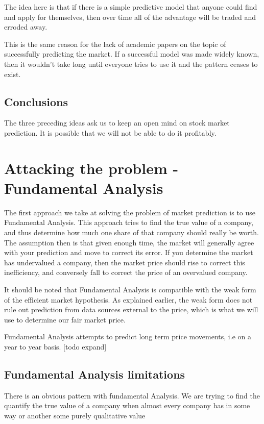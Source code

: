\documentclass{report}
\begin{document}
The idea here is that if there is a simple predictive model that anyone could find and apply for themselves, then over time all of the advantage will be traded and erroded away.

This is the same reason for the lack of academic papers on the topic of successfully predicting the market. If a successful model was made widely known, then it wouldn't take long until everyone tries to use it and the pattern ceases to exist.

\section{Conclusions}

The three preceding ideas ask us to keep an open mind on stock market prediction. It is possible that we will not be able to do it profitably.

\chapter{Attacking the problem - Fundamental Analysis}

The first approach we take at solving the problem of market prediction is to use Fundamental Analysis. This approach tries to find the true value of a company, and thus determine how much one share of that company should really be worth. The assumption then is that given enough time, the market will generally agree with your prediction and move to correct its error. If you determine the market has undervalued a company, then the market price should rise to correct this inefficiency, and conversely fall to correct the price of an overvalued company. 

It should be noted that Fundamental Analysis is compatible with the weak form of the efficient market hypothesis. As explained earlier, the weak form does not rule out prediction from data sources external to the price, which is what we will use to determine our fair market price.

Fundamental Analysis attempts to predict long term price movements, i.e on a year to year basis. [todo expand]

\section{Fundamental Analysis limitations}

There is an obvious pattern with fundamental Analysis. We are trying to find the quantify the true value of a company when almost every company has in some way or another some purely qualitative value
\end{document}
